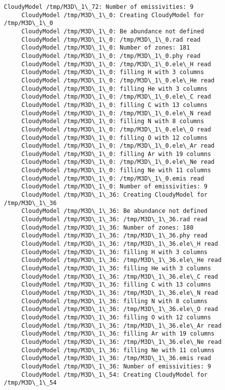 \documentclass[11pt]{article}
\begin{document}
\begin{Verbatim}[commandchars=\\\{\}]
     CloudyModel /tmp/M3D\_1\_72: Number of emissivities: 9
     CloudyModel /tmp/M3D\_1\_0: Creating CloudyModel for /tmp/M3D\_1\_0
     CloudyModel /tmp/M3D\_1\_0: Be abundance not defined
     CloudyModel /tmp/M3D\_1\_0: /tmp/M3D\_1\_0.rad read
     CloudyModel /tmp/M3D\_1\_0: Number of zones: 181
     CloudyModel /tmp/M3D\_1\_0: /tmp/M3D\_1\_0.phy read
     CloudyModel /tmp/M3D\_1\_0: /tmp/M3D\_1\_0.ele\_H read
     CloudyModel /tmp/M3D\_1\_0: filling H with 3 columns
     CloudyModel /tmp/M3D\_1\_0: /tmp/M3D\_1\_0.ele\_He read
     CloudyModel /tmp/M3D\_1\_0: filling He with 3 columns
     CloudyModel /tmp/M3D\_1\_0: /tmp/M3D\_1\_0.ele\_C read
     CloudyModel /tmp/M3D\_1\_0: filling C with 13 columns
     CloudyModel /tmp/M3D\_1\_0: /tmp/M3D\_1\_0.ele\_N read
     CloudyModel /tmp/M3D\_1\_0: filling N with 8 columns
     CloudyModel /tmp/M3D\_1\_0: /tmp/M3D\_1\_0.ele\_O read
     CloudyModel /tmp/M3D\_1\_0: filling O with 12 columns
     CloudyModel /tmp/M3D\_1\_0: /tmp/M3D\_1\_0.ele\_Ar read
     CloudyModel /tmp/M3D\_1\_0: filling Ar with 19 columns
     CloudyModel /tmp/M3D\_1\_0: /tmp/M3D\_1\_0.ele\_Ne read
     CloudyModel /tmp/M3D\_1\_0: filling Ne with 11 columns
     CloudyModel /tmp/M3D\_1\_0: /tmp/M3D\_1\_0.emis read
     CloudyModel /tmp/M3D\_1\_0: Number of emissivities: 9
     CloudyModel /tmp/M3D\_1\_36: Creating CloudyModel for /tmp/M3D\_1\_36
     CloudyModel /tmp/M3D\_1\_36: Be abundance not defined
     CloudyModel /tmp/M3D\_1\_36: /tmp/M3D\_1\_36.rad read
     CloudyModel /tmp/M3D\_1\_36: Number of zones: 180
     CloudyModel /tmp/M3D\_1\_36: /tmp/M3D\_1\_36.phy read
     CloudyModel /tmp/M3D\_1\_36: /tmp/M3D\_1\_36.ele\_H read
     CloudyModel /tmp/M3D\_1\_36: filling H with 3 columns
     CloudyModel /tmp/M3D\_1\_36: /tmp/M3D\_1\_36.ele\_He read
     CloudyModel /tmp/M3D\_1\_36: filling He with 3 columns
     CloudyModel /tmp/M3D\_1\_36: /tmp/M3D\_1\_36.ele\_C read
     CloudyModel /tmp/M3D\_1\_36: filling C with 13 columns
     CloudyModel /tmp/M3D\_1\_36: /tmp/M3D\_1\_36.ele\_N read
     CloudyModel /tmp/M3D\_1\_36: filling N with 8 columns
     CloudyModel /tmp/M3D\_1\_36: /tmp/M3D\_1\_36.ele\_O read
     CloudyModel /tmp/M3D\_1\_36: filling O with 12 columns
     CloudyModel /tmp/M3D\_1\_36: /tmp/M3D\_1\_36.ele\_Ar read
     CloudyModel /tmp/M3D\_1\_36: filling Ar with 19 columns
     CloudyModel /tmp/M3D\_1\_36: /tmp/M3D\_1\_36.ele\_Ne read
     CloudyModel /tmp/M3D\_1\_36: filling Ne with 11 columns
     CloudyModel /tmp/M3D\_1\_36: /tmp/M3D\_1\_36.emis read
     CloudyModel /tmp/M3D\_1\_36: Number of emissivities: 9
     CloudyModel /tmp/M3D\_1\_54: Creating CloudyModel for /tmp/M3D\_1\_54

\end{Verbatim}
\end{document}
